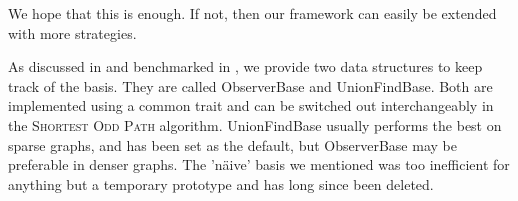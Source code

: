 We hope that this is enough. If not, then our framework can easily be extended with more strategies.

As discussed in  and benchmarked in , we provide two data structures to keep track of the basis. They are called ObserverBase and UnionFindBase. Both are implemented using a common trait and can be switched out interchangeably in the \textsc{Shortest Odd Path} algorithm. UnionFindBase usually performs the best on sparse graphs, and has been set as the default, but ObserverBase may be preferable in denser graphs. The 'näive' basis we mentioned was too inefficient for anything but a temporary prototype and has long since been deleted.
